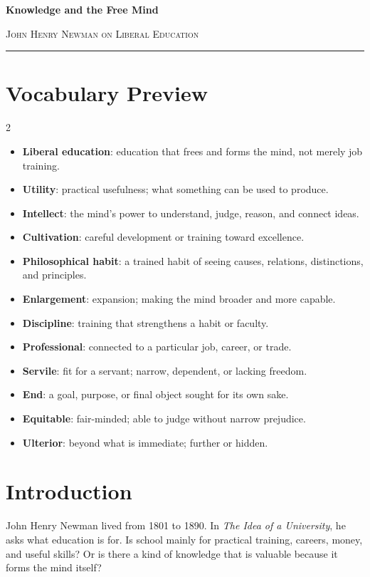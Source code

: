 \documentclass[12pt]{article}
\begin{document}
\begin{center}
{\LARGE\bfseries Knowledge and the Free Mind}\par\vspace{0.35em}
{\large\scshape John Henry Newman on Liberal Education}\par\vspace{0.6em}
\rule{0.82\textwidth}{0.4pt}\par\vspace{0.9em}
\end{center}

\section*{Vocabulary Preview}
\begin{multicols}{2}
\begin{itemize}[leftmargin=*, itemsep=0.2em]
\item \textbf{Liberal education}: education that frees and forms the mind, not merely job training.
\item \textbf{Utility}: practical usefulness; what something can be used to produce.
\item \textbf{Intellect}: the mind's power to understand, judge, reason, and connect ideas.
\item \textbf{Cultivation}: careful development or training toward excellence.
\item \textbf{Philosophical habit}: a trained habit of seeing causes, relations, distinctions, and principles.
\item \textbf{Enlargement}: expansion; making the mind broader and more capable.
\item \textbf{Discipline}: training that strengthens a habit or faculty.
\item \textbf{Professional}: connected to a particular job, career, or trade.
\item \textbf{Servile}: fit for a servant; narrow, dependent, or lacking freedom.
\item \textbf{End}: a goal, purpose, or final object sought for its own sake.
\item \textbf{Equitable}: fair-minded; able to judge without narrow prejudice.
\item \textbf{Ulterior}: beyond what is immediate; further or hidden.
\end{itemize}
\end{multicols}

\section*{Introduction}
John Henry Newman lived from 1801 to 1890. In \textit{The Idea of a University}, he asks what education is for. Is school mainly for practical training, careers, money, and useful skills? Or is there a kind of knowledge that is valuable because it forms the mind itself?
\end{document}
